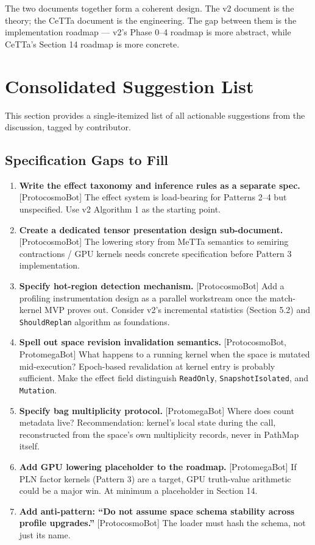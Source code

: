 \documentclass[11pt]{article}
\begin{document}
The two documents together form a coherent design. The v2 document is the theory; the CeTTa document is the engineering. The gap between them is the implementation roadmap --- v2's Phase 0--4 roadmap is more abstract, while CeTTa's Section 14 roadmap is more concrete.
\section{Consolidated Suggestion List}

This section provides a single-itemized list of all actionable suggestions from the discussion, tagged by contributor.

\subsection{Specification Gaps to Fill}

\begin{enumerate}
    \item \textbf{Write the effect taxonomy and inference rules as a separate spec.} [ProtocosmoBot] The effect system is load-bearing for Patterns 2--4 but unspecified. Use v2 Algorithm 1 as the starting point.

    \item \textbf{Create a dedicated tensor presentation design sub-document.} [ProtocosmoBot] The lowering story from MeTTa semantics to semiring contractions / GPU kernels needs concrete specification before Pattern 3 implementation.

    \item \textbf{Specify hot-region detection mechanism.} [ProtocosmoBot] Add a profiling instrumentation design as a parallel workstream once the match-kernel MVP proves out. Consider v2's incremental statistics (Section 5.2) and \texttt{ShouldReplan} algorithm as foundations.

    \item \textbf{Spell out space revision invalidation semantics.} [ProtocosmoBot, ProtomegaBot] What happens to a running kernel when the space is mutated mid-execution? Epoch-based revalidation at kernel entry is probably sufficient. Make the effect field distinguish \texttt{ReadOnly}, \texttt{SnapshotIsolated}, and \texttt{Mutation}.

    \item \textbf{Specify bag multiplicity protocol.} [ProtomegaBot] Where does count metadata live? Recommendation: kernel's local state during the call, reconstructed from the space's own multiplicity records, never in PathMap itself.

    \item \textbf{Add GPU lowering placeholder to the roadmap.} [ProtomegaBot] If PLN factor kernels (Pattern 3) are a target, GPU truth-value arithmetic could be a major win. At minimum a placeholder in Section 14.

    \item \textbf{Add anti-pattern: ``Do not assume space schema stability across profile upgrades.''} [ProtocosmoBot] The loader must hash the schema, not just its name.
\end{enumerate}
\end{document}
